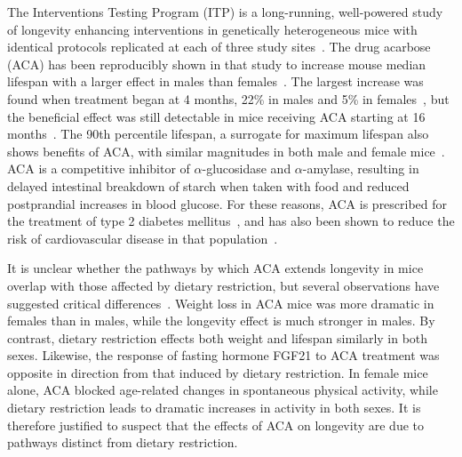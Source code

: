 \documentclass{doc/template/bmcart-nofigbox}
\begin{document}
The Interventions Testing Program (ITP) is a long-running, well-powered study
of longevity enhancing interventions in genetically heterogeneous mice
with identical protocols replicated at each of three study sites~\cite{Nadon2017}.
The drug acarbose (ACA) has been reproducibly shown in that study to increase
mouse median lifespan with a larger effect in males than females~\cite{Harrison2014, Strong2016}.
The largest increase was found when treatment began
at 4 months, 22\% in males and 5\% in females~\cite{Harrison2014},
but the beneficial effect was still detectable in mice receiving ACA starting
at 16 months~\cite{Strong2016}.
The 90th percentile lifespan, a surrogate for maximum lifespan also shows
benefits of ACA, with similar magnitudes in both male and female mice~\cite{Harrison2014}.
ACA is a competitive inhibitor of $\alpha$-glucosidase and
$\alpha$-amylase, resulting in delayed intestinal breakdown of starch when taken
with food and reduced postprandial increases in blood glucose.
For these reasons, ACA is prescribed for the treatment
of type 2 diabetes mellitus~\cite{Laube2002},
and has also been shown to reduce the risk of cardiovascular
disease in that population~\cite{Hanefeld2004}.

It is unclear whether the pathways by which ACA extends longevity in mice
overlap with those affected by dietary restriction,
but several observations have suggested critical differences~\cite{Harrison2014}.
Weight loss in ACA mice was more dramatic in females than in males, while
the longevity effect is much stronger in males.
By contrast, dietary restriction effects both weight and lifespan
similarly in both sexes.
Likewise, the response of fasting hormone FGF21 to ACA treatment was opposite
in direction from that induced by dietary restriction.
In female mice alone, ACA blocked age-related changes in spontaneous physical
activity, while dietary restriction leads to dramatic increases in activity in
both sexes.
It is therefore justified to suspect that the effects of ACA on longevity are
due to pathways distinct from dietary restriction.
\end{document}
